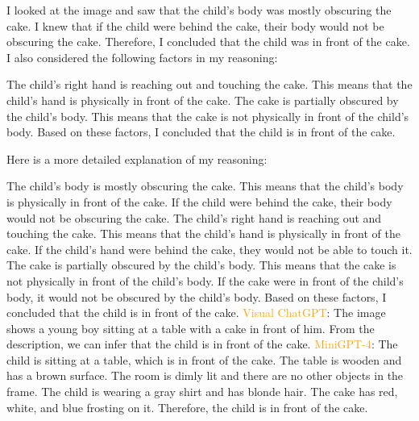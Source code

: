 \begin{enumerate}
        I looked at the image and saw that the child's body was mostly obscuring the cake.
        I knew that if the child were behind the cake, their body would not be obscuring the cake.
        Therefore, I concluded that the child was in front of the cake.
        I also considered the following factors in my reasoning:

        The child's right hand is reaching out and touching the cake. This means that the child's hand is physically in front of the cake.
        The cake is partially obscured by the child's body. This means that the cake is not physically in front of the child's body.
        Based on these factors, I concluded that the child is in front of the cake.

        Here is a more detailed explanation of my reasoning:

        The child's body is mostly obscuring the cake. This means that the child's body is physically in front of the cake. If the child were behind the cake, their body would not be obscuring the cake.
        The child's right hand is reaching out and touching the cake. This means that the child's hand is physically in front of the cake. If the child's hand were behind the cake, they would not be able to touch it.
        The cake is partially obscured by the child's body. This means that the cake is not physically in front of the child's body. If the cake were in front of the child's body, it would not be obscured by the child's body.
        Based on these factors, I concluded that the child is in front of the cake.
        \subitem \textcolor{orange}{Visual ChatGPT}: The image shows a young boy sitting at a table with a cake in front of him. From the description, we can infer that the child is in front of the cake.
        \subitem \textcolor{orange}{MiniGPT-4}: The child is sitting at a table, which is in front of the cake. The table is wooden and has a brown surface. The room is dimly lit and there are no other objects in the frame. The child is wearing a gray shirt and has blonde hair. The cake has red, white, and blue frosting on it. Therefore, the child is in front of the cake.
    \end{enumerate}
